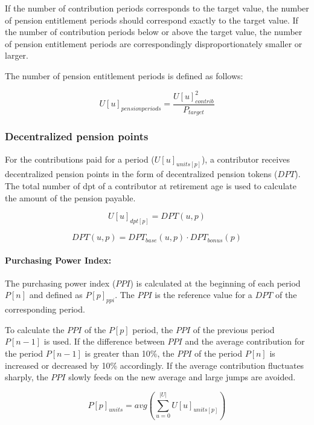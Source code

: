 If the number of contribution periods corresponds to the target value, the number of pension entitlement periods should correspond exactly to the target value. If the number of contribution periods below or above the target value, the number of pension entitlement periods are correspondingly disproportionately smaller or larger.  

The number of pension entitlement periods is defined as follows:

\begin{equation}
U[u]_{pensionperiods} = \frac{U[u]_{contrib}^2}{P_{target}}
\end{equation}


\subsubsection{Decentralized pension points}

For the contributions paid for a period ($U[u]_{units[p]}$), a contributor receives decentralized pension points in the form of decentralized pension tokens ($DPT$). The total number of \gls{dpt} of a contributor at retirement age is used to calculate the amount of the pension payable.

\begin{equation}
U[u]_{dpt[p]} = DPT(u, p)
\end{equation}

\begin{equation}
DPT(u, p) = DPT_{base}(u, p) \cdot DPT_{bonus}(p)
\end{equation}

\paragraph*{Purchasing Power Index:}

The purchasing power index ($PPI$) is calculated at the beginning of each period $P[n]$ and defined as $P[p]_{ppi}$. The $PPI$ is the reference value for a $DPT$ of the corresponding period.

To calculate the $PPI$ of the $P[p]$ period, the $PPI$ of the previous period $P[n-1]$ is used.
If the difference between $PPI$ and the average contribution for the period $P[n-1]$ is greater than 10\%, the $PPI$ of the period $P[n]$ is increased or decreased by 10\% accordingly.
If the average contribution fluctuates sharply, the $PPI$ slowly feeds on the new average and large jumps are avoided.

\begin{equation}
P[p]_{units} = avg(\sum_{u=0}^{|U|} U[u]_{units[p]})
\end{equation}

